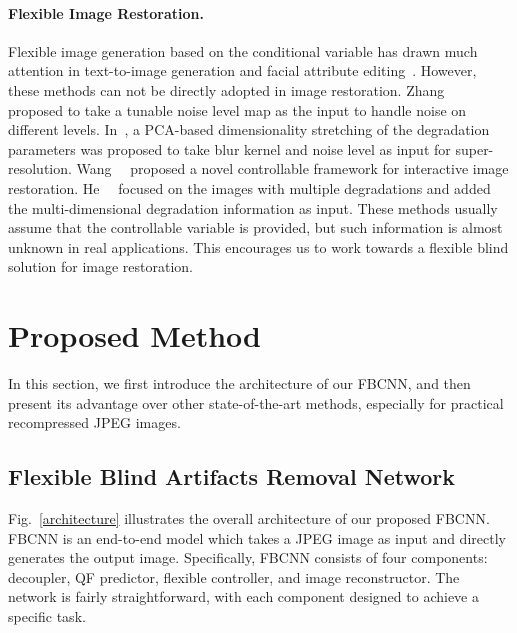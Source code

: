 \documentclass[10pt,twocolumn,letterpaper]{article}
\begin{document}
\paragraph{Flexible Image Restoration.}
Flexible image generation based on the conditional variable has drawn much attention in \eg text-to-image generation \cite{li2019controllable, reed2016generative, xu2018attngan} and facial attribute editing~\cite{choi2018stargan, he2019attgan, liu2019stgan}.
However, these methods can not be directly adopted in image restoration. Zhang~\etal~\cite{zhang2018ffdnet} proposed to take a tunable noise level map as the input to handle noise on different levels. In~\cite{zhang2018learning}, a PCA-based dimensionality stretching of the degradation parameters was proposed to take blur kernel and noise level as input for super-resolution. Wang~\etal~\cite{wang2019cfsnet} proposed a novel controllable framework for interactive image restoration. He~\etal~\cite{he2020interactive} focused on the images with multiple degradations and added the multi-dimensional degradation information as input. These methods usually assume that the controllable variable is provided, but such information is almost unknown in real applications. This encourages us to work towards a flexible blind solution for image restoration.

\section{Proposed Method}
In this section, we first introduce the architecture of our FBCNN, and then present its advantage over other state-of-the-art methods, especially for practical recompressed JPEG images.

\subsection{Flexible Blind Artifacts Removal Network}
Fig.~\ref{architecture} illustrates the overall architecture of our proposed FBCNN. FBCNN is an end-to-end model which takes a JPEG image as input and directly generates the output image. Specifically, FBCNN consists of four components: decoupler, QF predictor, flexible controller, and image reconstructor. The network is fairly straightforward, with each component designed to achieve a specific task. 
\end{document}
